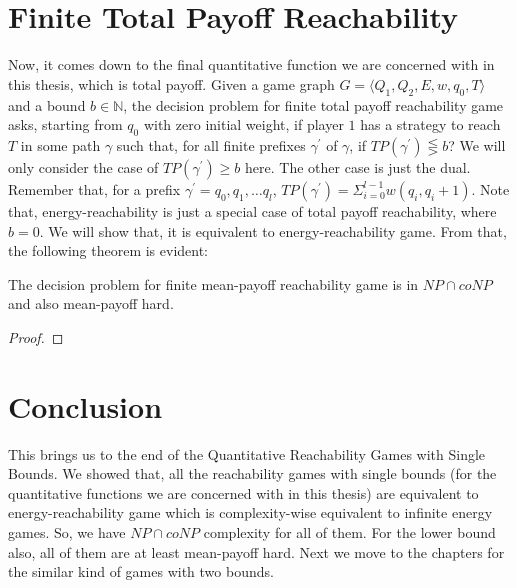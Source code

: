 \section{Finite Total Payoff Reachability}
Now, it comes down to the final quantitative function we are concerned with in this thesis, which is total payoff. Given a game graph $G=\langle Q_1, Q_2, E, w, q_0,T\rangle$ and a bound $b \in \mathbb{N}$, the decision problem for finite total payoff reachability game asks, starting from $q_0$ with zero initial weight, if player $1$ has a strategy to reach $T$ in some path $\gamma$ such that, for all finite prefixes $\gamma^{\prime}$ of $\gamma$, if $TP(\gamma^{\prime}) \lesseqgtr b$? We will only consider the case of  $TP(\gamma^{\prime}) \geq b$ here. The other case is just the dual. Remember that, for a prefix $\gamma^{\prime}= q_0,q_1,\ldots q_l$, $TP(\gamma^{\prime})= \Sigma_{i=0}^{l-1} w(q_i,q_i+1)$. Note that, energy-reachability is just a special case of total payoff reachability, where $b=0$. We will show that, it is equivalent to energy-reachability game. From that, the following theorem is evident:\\
\begin{theorem}
\label{fin-totalpayoff-thm}
The decision problem for finite mean-payoff reachability game is in $NP \cap coNP$ and also mean-payoff hard. 
\end{theorem}
\begin{proof}
\huge{}
\end{proof}

\section{Conclusion}
This brings us to the end of the Quantitative Reachability Games with Single Bounds. We showed that, all the reachability games with single bounds (for the quantitative functions we are concerned with in this thesis) are equivalent to energy-reachability game which is complexity-wise equivalent to infinite energy games. So, we have $NP \cap coNP$ complexity for all of them. For the lower bound also, all of them are at least mean-payoff hard. Next we move to the chapters for the similar kind of games with two bounds. 
